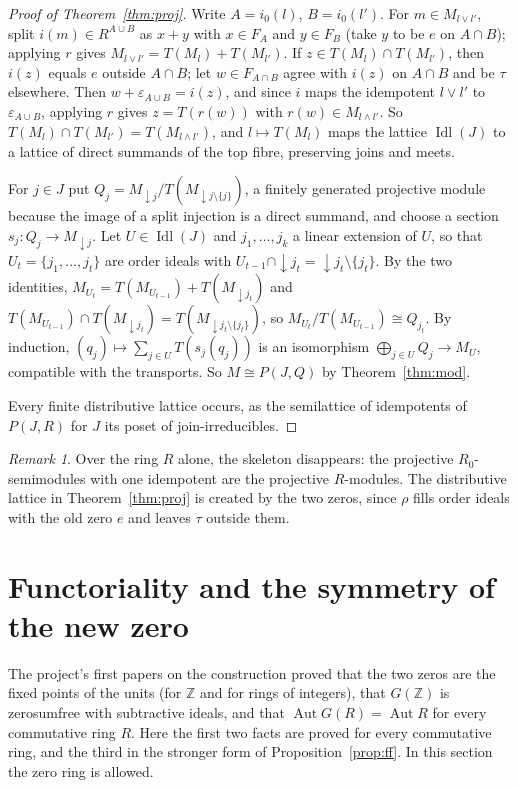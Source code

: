 \documentclass[11pt]{amsart}
\theoremstyle{remark}
\newtheorem{remark}[thm]{Remark}
\DeclareMathOperator{\Idl}{Idl}
\begin{document}
\begin{proof}[Proof of Theorem~\ref{thm:proj}]
Write $A=i_0(l)$, $B=i_0(l')$. For $m\in M_{l\vee l'}$, split $i(m)\in R^{A\cup B}$ as $x+y$ with $x\in F_A$ and $y\in F_B$ (take $y$ to be $e$ on $A\cap B$); applying $r$ gives $M_{l\vee l'}=T(M_l)+T(M_{l'})$. If $z\in T(M_l)\cap T(M_{l'})$, then $i(z)$ equals $e$ outside $A\cap B$; let $w\in F_{A\cap B}$ agree with $i(z)$ on $A\cap B$ and be $\tau$ elsewhere. Then $w+\varepsilon_{A\cup B}=i(z)$, and since $i$ maps the idempotent $l\vee l'$ to $\varepsilon_{A\cup B}$, applying $r$ gives $z=T(r(w))$ with $r(w)\in M_{l\wedge l'}$. So $T(M_l)\cap T(M_{l'})=T(M_{l\wedge l'})$, and $l\mapsto T(M_l)$ maps the lattice $\Idl(J)$ to a lattice of direct summands of the top fibre, preserving joins and meets.

For $j\in J$ put $Q_j=M_{{\downarrow}j}/T(M_{{\downarrow}j\setminus\{j\}})$, a finitely generated projective module because the image of a split injection is a direct summand, and choose a section $s_j\colon Q_j\to M_{{\downarrow}j}$. Let $U\in\Idl(J)$ and $j_1,\dots,j_k$ a linear extension of $U$, so that $U_t=\{j_1,\dots,j_t\}$ are order ideals with $U_{t-1}\cap{\downarrow}j_t={\downarrow}j_t\setminus\{j_t\}$. By the two identities, $M_{U_t}=T(M_{U_{t-1}})+T(M_{{\downarrow}j_t})$ and $T(M_{U_{t-1}})\cap T(M_{{\downarrow}j_t})=T(M_{{\downarrow}j_t\setminus\{j_t\}})$, so $M_{U_t}/T(M_{U_{t-1}})\cong Q_{j_t}$. By induction, $(q_j)\mapsto\sum_{j\in U}T(s_j(q_j))$ is an isomorphism $\bigoplus_{j\in U}Q_j\to M_U$, compatible with the transports. So $M\cong P(J,Q)$ by Theorem~\ref{thm:mod}.

Every finite distributive lattice occurs, as the semilattice of idempotents of $P(J,R)$ for $J$ its poset of join-irreducibles.
\end{proof}

\begin{remark}
Over the ring $R$ alone, the skeleton disappears: the projective $R_0$-semimodules with one idempotent are the projective $R$-modules. The distributive lattice in Theorem~\ref{thm:proj} is created by the two zeros, since $\rho$ fills order ideals with the old zero $e$ and leaves $\tau$ outside them.
\end{remark}

\section{Functoriality and the symmetry of the new zero}\label{sec:sym}
The project's first papers on the construction proved that the two zeros are the fixed points of the units (for $\mathbb Z$ and for rings of integers), that $G(\mathbb Z)$ is zerosumfree with subtractive ideals, and that $\operatorname{Aut}G(R)=\operatorname{Aut}R$ for every commutative ring $R$. Here the first two facts are proved for every commutative ring, and the third in the stronger form of Proposition~\ref{prop:ff}. In this section the zero ring is allowed.
\end{document}
